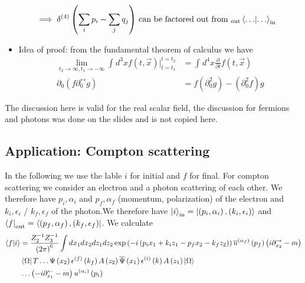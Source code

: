 \documentclass{report}
\begin{document}
\begin{itemize}
\begin{align*}
      \implies \delta^{\left( 4 \right) } \left( \sum_{i}^{} p_i - \sum_{j}^{} q_j   \right) & \text{ can be factored out from } _\text{out} \bra{\ldots} \ket{\ldots} _\text{in} 
    \end{align*}
  \item Idea of proof: from the fundamental theorem of calculus we have 
    \begin{align*}
      \lim_{t_2 \to \infty, t_1 \to -\infty} \int_{}^{} d^3x f\left( t,\vec{x} \right)|_{t=t_1}^{t=t_2} &= \int_{}^{} d^{4} x \frac{\partial }{\partial t} f\left( t,\vec{x} \right)   \\ 
      \partial_0\left( f \partial_0^{\leftrightarrow} g  \right) &= f\left( \partial_0^2g  \right) - \left( \partial_0^2 f  \right) g
    \end{align*}
\end{itemize}
The discussion here is valid for the real scalar field, the discussion for fermions and photons was done on the slides and is not copied here.\\
\subsection{Application: Compton scattering}
In the following we use the lable $i$ for initial and $f$ for final. For compton scattering we consider an electron and a photon scattering of each other. We therefore have $p_i, \alpha_i$ and $p_f, \alpha_f$ (momentum, polarization) of the electron and $k_i, \epsilon_i$ / $k_f, \epsilon_f$ of the photon.We therefore have $\ket{i} _\text{in} = \ket{\left( p_i, \alpha_i \right) , \left( k_i, \epsilon_i \right) } $ and $\bra{f}_\text{out} = \bra{\left( p_f, \alpha_f \right) , \left( k_f, \epsilon_f \right) } $. We calculate
\begin{align*}
  \bra{f} \ket{i} &= \frac{Z_2^{-1} Z_3^{-1} }{\left( 2\pi \right) ^{6} } \int dx_1dx_2dz_1dz_2 \exp\left( -i\left( p_ix_1 + k_i z_1 - p_f x_2 - k_f z_2 \right)  \right) \overline{u}^{\left( \alpha_f \right) } \left( p_f \right) \left( i \partial_{x_2} ^{\rightarrow} - m  \right)         \\
                  &\bra{\Omega} T \ldots \Psi\left( x_2 \right)\epsilon^{\left( f \right) } \left( k_f \right) A\left( z_2 \right)   \overline{\Psi}\left( x_1 \right) \epsilon^{\left( i \right) } \left( k \right) A\left( z_1 \right) \ket{\Omega}   \\
                  &\ldots \left( -i \partial_{x_1}^{\leftarrow} - m \right) u^{\left( \alpha_i \right) } \left( p_i \right) 
\end{align*}
\end{document}
